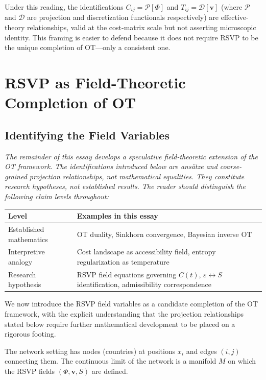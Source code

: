 \documentclass[12pt]{article}
\begin{document}
Under this reading, the identifications $C_{ij} = \mathcal{P}[\Phi]$ and $T_{ij} = \mathcal{D}[\mathbf{v}]$ (where $\mathcal{P}$ and $\mathcal{D}$ are projection and discretization functionals respectively) are effective-theory relationships, valid at the cost-matrix scale but not asserting microscopic identity. This framing is easier to defend because it does not require RSVP to be the unique completion of OT---only a consistent one.

\section{RSVP as Field-Theoretic Completion of OT}

\subsection{Identifying the Field Variables}

\textit{The remainder of this essay develops a speculative field-theoretic extension of the OT framework. The identifications introduced below are ansätze and coarse-grained projection relationships, not mathematical equalities. They constitute research hypotheses, not established results. The reader should distinguish the following claim levels throughout:}

\begin{center}
\renewcommand{\arraystretch}{1.4}
\begin{tabular}{p{3cm} p{9.5cm}}
\toprule
\textbf{Level} & \textbf{Examples in this essay} \\
\midrule
Established mathematics & OT duality, Sinkhorn convergence, Bayesian inverse OT \\
Interpretive analogy & Cost landscape as accessibility field, entropy regularization as temperature \\
Research hypothesis & RSVP field equations governing $C(t)$, $\varepsilon \leftrightarrow S$ identification, admissibility correspondence \\
\bottomrule
\end{tabular}
\end{center}

We now introduce the RSVP field variables as a candidate completion of the OT framework, with the explicit understanding that the projection relationships stated below require further mathematical development to be placed on a rigorous footing.

The network setting has nodes (countries) at positions $x_i$ and edges $(i,j)$ connecting them. The continuous limit of the network is a manifold $M$ on which the RSVP fields $(\Phi, \mathbf{v}, S)$ are defined.
\end{document}
